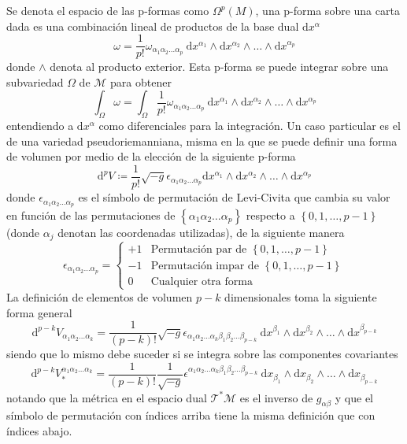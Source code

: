 \documentclass[11pt,twoside,openright,spanish]{report}
\numberwithin{equation}{chapter}
\numberwithin{figure}{chapter}
\numberwithin{table}{chapter}
\begin{document}
Se denota el espacio de las p-formas como $\Omega^p(M)$, una p-forma sobre una carta dada es una combinación lineal de productos de la base dual $\text{d}x^\alpha$
\begin{equation}
\omega=\frac{1}{p!}\omega_{\alpha_1 \alpha_2\dots\alpha_p}\ \text{d}x^{\alpha_1}\wedge\text{d}x^{\alpha_2}\wedge\dots\wedge\text{d}x^{\alpha_p}
\end{equation}
donde $\wedge$ denota al producto exterior. Esta p-forma se puede integrar sobre una subvariedad $\Omega$ de $\mathcal{M}$ para obtener
\begin{equation}
\int_\Omega \omega=\int_{\Omega}\frac{1}{p!}\omega_{\alpha_1 \alpha_2\dots\alpha_p}\ \text{d}x^{\alpha_1}\wedge\text{d}x^{\alpha_2}\wedge\dots\wedge\text{d}x^{\alpha_p}
\end{equation}
entendiendo a $\text{d}x^\alpha$ como diferenciales para la integración. Un caso particular es el de una variedad pseudoriemanniana, misma en la que se puede definir una forma de volumen por medio de la elección de la siguiente p-forma
\begin{equation}
\text{d}^pV\coloneqq\frac{1}{p!}\sqrt{-g}\epsilon_{\alpha_1 \alpha_2\dots\alpha_p}\text{d}x^{\alpha_1}\wedge\text{d}x^{\alpha_2}\wedge\dots\wedge\text{d}x^{\alpha_p}
\end{equation} 
donde $\epsilon_{\alpha_1 \alpha_2\dots\alpha_p}$ es el símbolo de permutación de Levi-Civita que cambia su valor en función de las permutaciones de $\left\{\alpha_1 \alpha_2\dots\alpha_p\right\}$ respecto a $\left\{0,1,\dots,p-1\right\}$ (donde $\alpha_j$ denotan las coordenadas utilizadas), de la siguiente manera 
\begin{equation}
\epsilon_{\alpha_1 \alpha_2\dots\alpha_p} = \left\{
\begin{array}{ll}
+1      & \text{Permutación par de }\left\{0,1,\dots,p-1\right\}\\
-1      & \text{Permutación impar de }\left\{0,1,\dots,p-1\right\}\\
0       & \text{Cualquier otra forma}
\end{array}
\right.
\end{equation}
La definición de elementos de volumen $p-k$ dimensionales toma la siguiente forma general
\begin{equation}
\text{d}^{p-k}V_{\alpha_1\alpha_2\dots\alpha_k}=\frac{1}{\left(p-k\right)!}\sqrt{-g}\epsilon_{\alpha_1\alpha_2\dots\alpha_k\beta_1\beta_2\dots\beta_{p-k}}\ \text{d}x^{\beta_1}\wedge\text{d}x^{\beta_2}\wedge\dots\wedge\text{d}x^{\beta_{p-k}}
\end{equation}
siendo que lo mismo debe suceder si se integra sobre las componentes covariantes
\begin{equation}
\text{d}^{p-k}V_{*}^{\alpha_1\alpha_2\dots\alpha_k}=\frac{1}{\left(p-k\right)!}\frac{1}{\sqrt{-g}}\epsilon^{\alpha_1\alpha_2\dots\alpha_k\beta_1\beta_2\dots\beta_{p-k}}\ \text{d}x_{\beta_1}\wedge\text{d}x_{\beta_2}\wedge\dots\wedge\text{d}x_{\beta_{p-k}}
\label{elvolcov}
\end{equation}
notando que la métrica en el espacio dual $\mathcal{T^*M}$ es el inverso de $g_{\alpha\beta}$ y que el símbolo de permutación con índices arriba tiene la misma definición que con índices abajo. 
\end{document}
